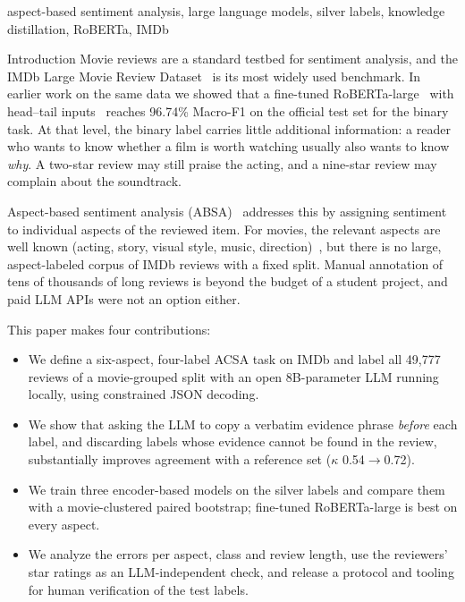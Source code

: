\documentclass[conference]{IEEEtran}
\makeatletter
\def\section{\@startsection{section}{1}{\z@}{2.2ex plus 1ex minus .5ex}{1ex plus .3ex}%
  {\normalfont\fontsize{12}{14}\selectfont\bfseries\scshape\centering}}
\makeatother
\begin{document}
\begin{IEEEkeywords}
aspect-based sentiment analysis, large language models, silver labels, knowledge distillation, RoBERTa, IMDb
\end{IEEEkeywords}

\section{Introduction}
Movie reviews are a standard testbed for sentiment analysis, and the IMDb Large Movie Review Dataset~\cite{maas2011} is its most widely used benchmark. In earlier work on the same data we showed that a fine-tuned RoBERTa-large~\cite{liu2019roberta} with head--tail inputs~\cite{sun2019} reaches 96.74\% Macro-F1 on the official test set for the binary task. At that level, the binary label carries little additional information: a reader who wants to know whether a film is worth watching usually also wants to know \emph{why}. A two-star review may still praise the acting, and a nine-star review may complain about the soundtrack.

Aspect-based sentiment analysis (ABSA)~\cite{pontiki2014,zhang2023survey} addresses this by assigning sentiment to individual aspects of the reviewed item. For movies, the relevant aspects are well known (acting, story, visual style, music, direction)~\cite{thet2010}, but there is no large, aspect-labeled corpus of IMDb reviews with a fixed split. Manual annotation of tens of thousands of long reviews is beyond the budget of a student project, and paid LLM APIs were not an option either.

This paper makes four contributions:
\begin{itemize}
\item We define a six-aspect, four-label ACSA task on IMDb and label all 49{,}777 reviews of a movie-grouped split with an open 8B-parameter LLM running locally, using constrained JSON decoding.
\item We show that asking the LLM to copy a verbatim evidence phrase \emph{before} each label, and discarding labels whose evidence cannot be found in the review, substantially improves agreement with a reference set ($\kappa$ 0.54$\rightarrow$0.72).
\item We train three encoder-based models on the silver labels and compare them with a movie-clustered paired bootstrap; fine-tuned RoBERTa-large is best on every aspect.
\item We analyze the errors per aspect, class and review length, use the reviewers' star ratings as an LLM-independent check, and release a protocol and tooling for human verification of the test labels.
\end{itemize}
\end{document}
